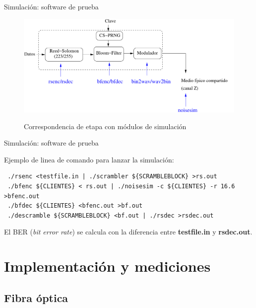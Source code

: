 \documentclass[aspectratio=169]{beamer}
\begin{document}
\begin{frame}{Simulación: software de prueba}

  \begin{figure}[t]
    \includegraphics[width=0.90 \textwidth]{../graphs/Soft-stack-sim} 
    
    Correspondencia de etapa con módulos de simulación
\end{figure}


\end{frame}

\begin{frame}[fragile]{Simulación: software de prueba}

Ejemplo de linea de comando para lanzar la simulación:

\small
\begin{verbatim}
 ./rsenc <testfile.in | ./scrambler ${SCRAMBLEBLOCK} >rs.out
 ./bfenc ${CLIENTES} < rs.out | ./noisesim -c ${CLIENTES} -r 16.6 >bfenc.out
 ./bfdec ${CLIENTES} <bfenc.out >bf.out
 ./descramble ${SCRAMBLEBLOCK} <bf.out | ./rsdec >rsdec.out
\end{verbatim}
\normalsize

El BER (\textit{bit error rate}) se calcula con la diferencia entre \textbf{testfile.in} y \textbf{rsdec.out}.
\end{frame}

\section{Implementación y mediciones}
\subsection{Fibra óptica}
\end{document}
